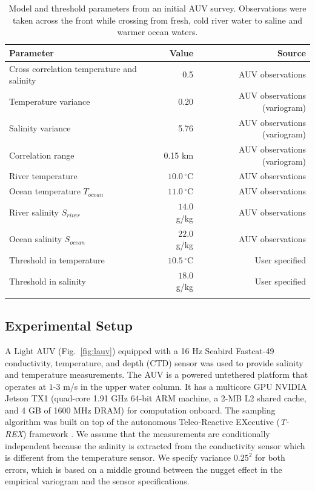 \documentclass[aoas]{imsart}
\begin{document}
\begin{table}[!h]
\centering
\begin{tabular}{lrr}
\toprule
Parameter & Value & Source\\
\midrule
\rowcolor{Gray}
Cross correlation temperature and salinity & 0.5 & AUV observations\\
Temperature variance &  0.20 & AUV observations (variogram)\\
\rowcolor{Gray}
Salinity variance &  5.76 & AUV observations (variogram)\\
Correlation range  & 0.15 km & AUV observations (variogram)\\
\rowcolor{Gray}
River temperature  & $10.0\,^{\circ}\mathrm{C}$ & AUV observations\\
Ocean temperature $T_{ocean}$ & $11.0\,^{\circ}\mathrm{C}$ & AUV observations\\
\rowcolor{Gray}
River salinity $S_{river}$ & $14.0$ g/kg & AUV observations\\
Ocean salinity $S_{ocean}$ & $22.0$ g/kg & AUV observations\\
\rowcolor{Gray}
Threshold in temperature & $10.5\,^{\circ}\mathrm{C}$ & User specified \\
Threshold in salinity & $18.0$ g/kg & User specified \\
\rowcolor{Gray}
\bottomrule
\end{tabular}
\caption{Model and threshold parameters from an initial AUV
  survey. Observations were taken across the front while crossing from
  fresh, cold river water to saline and warmer ocean waters.}
\label{tab:experiment_param}
\end{table}


\subsection{Experimental Setup}

A Light AUV \citep{sousa2012lauv} (Fig.~\ref{fig:lauv}) equipped with
a 16 Hz Seabird Fastcat-49 conductivity, temperature, and depth (CTD)
sensor was used to provide salinity and temperature measurements.  The
AUV is a powered untethered platform that operates at $1$-$3$ m/s in
the upper water column. It has a multicore GPU NVIDIA Jetson TX1
(quad-core 1.91 GHz 64-bit ARM machine, a 2-MB L2 shared cache, and 4
GB of 1600 MHz DRAM) for computation onboard.  The sampling algorithm
was built on top of the autonomous Teleo-Reactive EXecutive
(\textit{T-REX}) framework \citep{py10,Rajan12,Rajan12b}. We assume
that the measurements are conditionally independent because the
salinity is extracted from the conductivity sensor which is different
from the temperature sensor. We specify variance $0.25^2$ for both
errors, which is based on a middle ground between the nugget effect in
the empirical variogram and the sensor specifications.
\end{document}
